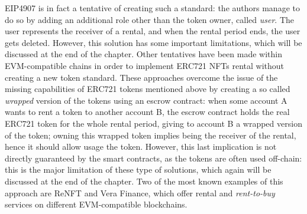 \documentclass[english, LaM, oneside]{sapthesis}%
\begin{document}
EIP4907 is in fact a tentative of creating such a standard: the authors manage to do so by adding an additional role other than the token owner, called \textit{user}. The user represents the receiver of a rental, and when the rental period ends, the user gets deleted. However, this solution has some important limitations, which will be discussed at the end of the chapter.\newline
Other tentatives have been made within EVM-compatible chains in order to implement ERC721 NFTs rental without creating a new token standard. These approaches overcome the issue of the missing capabilities of ERC721 tokens mentioned above by creating a so called \textit{wrapped} version of the tokens using an escrow contract: when some account A wants to rent a token to another account B, the escrow contract holds the real ERC721 token for the whole rental period, giving to account B a wrapped version of the token; owning this wrapped token implies being the receiver of the rental, hence it should allow usage the token. However, this last implication is not directly guaranteed by the smart contracts, as the tokens are often used off-chain: this is the major limitation of these type of solutions, which again will be discussed at the end of the chapter.
Two of the most known examples of this approach are ReNFT\cite{ref:renft} and Vera Finance\cite{ref:vera}, which offer rental and \textit{rent-to-buy} services on different EVM-compatible blockchains.
\end{document}
